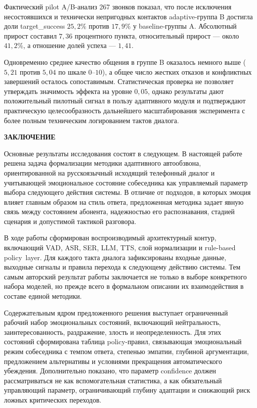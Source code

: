 \documentclass[a4paper,14pt]{extarticle}
\newcommand{\VkrStructuralSection}[1]{%
  \FloatBarrier
  \clearpage
  \phantomsection
  \addcontentsline{toc}{section}{#1}%
  \begin{center}\bfseries #1\end{center}%
  \par\nopagebreak\vspace{12pt}%
}
\renewcommand{\texttt}[1]{\textnormal{#1}}
\begin{document}
Фактический pilot A/B-анализ 267 звонков показал, что после исключения
несостоявшихся и технически непригодных контактов adaptive-группа
\texttt{B} достигла доли \texttt{target\_\allowbreak{}success} \(25{,}2\%\) против
\(17{,}9\%\) у baseline-группы \texttt{A}. Абсолютный прирост составил
\(7{,}36\) процентного пункта, относительный прирост --- около
\(41{,}2\%\), а отношение долей успеха --- \(1{,}41\).

Одновременно среднее качество общения в группе \texttt{B} оказалось
немного выше (\(5{,}21\) против \(5{,}04\) по шкале \(0\)--\(10\)), а
общее число жестких отказов и конфликтных завершений осталось
сопоставимым. Статистическая проверка не позволяет утверждать значимость
эффекта на уровне \(0{,}05\), однако результаты дают положительный
пилотный сигнал в пользу адаптивного модуля и подтверждают практическую
целесообразность дальнейшего масштабирования эксперимента с более полным
техническим логированием тактов диалога.

\VkrStructuralSection{ЗАКЛЮЧЕНИЕ}\label{ux437ux430ux43aux43bux44eux447ux435ux43dux438ux435}

Основные результаты исследования состоят в следующем. В настоящей работе
решена задача формализации методики адаптивного автообзвона,
ориентированной на русскоязычный исходящий телефонный диалог и
учитывающей эмоциональное состояние собеседника как управляемый параметр
выбора следующего действия системы. В отличие от подходов, в которых
эмоция влияет главным образом на стиль ответа, предложенная методика
задает явную связь между состоянием абонента, надежностью его
распознавания, стадией сценария и допустимой тактикой разговора.

В ходе работы сформирован воспроизводимый архитектурный контур,
включающий \texttt{VAD}, \texttt{ASR}, \texttt{SER}, \texttt{LLM},
\texttt{TTS}, слой нормализации и rule-based \texttt{policy\ layer}. Для
каждого такта диалога зафиксированы входные данные, выходные сигналы и
правила перехода к следующему действию системы. Тем самым авторский
результат работы заключается не только в выборе конкретного набора
моделей, но прежде всего в формальном описании их взаимодействия в
составе единой методики.

Содержательным ядром предложенного решения выступает ограниченный
рабочий набор эмоциональных состояний, включающий нейтральность,
заинтересованность, раздражение, злость и неопределенность. Для этих
состояний сформирована таблица policy-правил, связывающая эмоциональный
режим собеседника с темпом ответа, степенью эмпатии, глубиной
аргументации, предложением альтернативы и условиями прекращения
автоматического убеждения. Дополнительно показано, что параметр
\texttt{confidence} должен рассматриваться не как вспомогательная
статистика, а как обязательный управляющий параметр, ограничивающий
глубину адаптации и снижающий риск ложных критических переходов.
\end{document}
